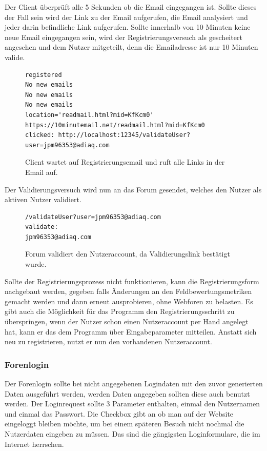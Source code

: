 Der Client überprüft alle 5 Sekunden ob die Email eingegangen ist. Sollte dieses der Fall sein wird der Link zu der Email aufgerufen, die Email analysiert und jeder darin befindliche Link aufgerufen. Sollte innerhalb von 10 Minuten keine neue Email eingegangen sein, wird der Registrierungsversuch als gescheitert angesehen und dem Nutzer mitgeteilt, denn die Emailadresse ist nur 10 Minuten valide.

\begin{figure}[ht]
\begin{lstlisting}[language=HTML5]
registered
No new emails
No new emails
No new emails
location='readmail.html?mid=KfKcm0'
https://10minutemail.net/readmail.html?mid=KfKcm0
clicked: http://localhost:12345/validateUser?user=jpm96353@adiaq.com
\end{lstlisting}
\caption{Client wartet auf Registrierungsemail und ruft alle Links in der Email auf.}
\end{figure}

Der Validierungsversuch wird nun an das Forum gesendet, welches den Nutzer als aktiven Nutzer validiert.

\begin{figure}[ht]
\begin{lstlisting}[language=HTML5]
/validateUser?user=jpm96353@adiaq.com
validate:
jpm96353@adiaq.com
\end{lstlisting}
\caption{Forum validiert den Nutzeraccount, da Validierungslink bestätigt wurde.}
\end{figure}

Sollte der Registrierungsprozess nicht funktionieren, kann die Registrierungsform nachgebaut werden, gegeben falls Änderungen an den Feldbewertungsmetriken gemacht werden und dann erneut ausprobieren, ohne Webforen zu belasten. Es gibt auch die Möglichkeit für das Programm den Registrierungsschritt zu überspringen, wenn der Nutzer schon einen Nutzeraccount per Hand angelegt hat, kann er das dem Programm über Eingabeparameter mitteilen. Anstatt sich neu zu registrieren, nutzt er nun den vorhandenen Nutzeraccount.

\subsubsection{Forenlogin}
Der Forenlogin sollte bei nicht angegebenen Logindaten mit den zuvor generierten Daten ausgeführt werden, werden Daten angegeben sollten diese auch benutzt werden. Der Loginrequest sollte 3 Parameter enthalten, einmal den Nutzernamen und einmal das Passwort. Die Checkbox gibt an ob man auf der Website eingeloggt bleiben möchte, um bei einem späteren Besuch nicht nochmal die Nutzerdaten eingeben zu müssen. Das sind die gängigsten Loginformulare, die im Internet herrschen.

